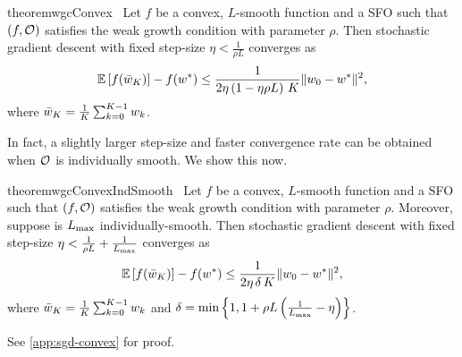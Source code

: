 \begin{restatable}{theorem}{wgcConvex}~\label{thm:wgc-convex}
    Let \( f \) be a convex, \( L \)-smooth function and \oracle{} a \ac{SFO} such that \( \rbr{f, \oracle{}} \) satisfies the weak growth condition with parameter \( \rho \).
    Then stochastic gradient descent with fixed step-size \( \eta < \frac{1}{\rho L} \) converges as
    \[ \E\sbr{\f(\bar \w_K)} - f(\wopt) \leq \frac{1}{2 \eta \rbr{1 - \eta \rho L} \, K} \norm{\w_0 - \wopt}^2, \]
    where \( \bar \w_K = \frac{1}{K} \sum_{k=0}^{K-1} \wk \). 
\end{restatable}

In fact, a slightly larger step-size and faster convergence rate can be obtained when \( \oracle{} \) is individually smooth.
We show this now.

\begin{restatable}{theorem}{wgcConvexIndSmooth}~\label{thm:wgc-convex-ind-smooth}
    Let \( f \) be a convex, \( L \)-smooth function and \oracle{} a \ac{SFO} such that \( \rbr{f, \oracle{}} \) satisfies the weak growth condition with parameter \( \rho \).
    Moreover, suppose \oracle{} is \( \Lmax \) individually-smooth. 
    Then stochastic gradient descent with fixed step-size \( \eta < \frac{1}{\rho L} + \frac{1}{\Lmax} \) converges as
    \[ \E\sbr{f(\bar w_K)} - f(\wopt) \leq \frac{1}{2\eta \, \delta \, K} \norm{\w_0 - \wopt}^2,   \]
    where \( \bar \w_K = \frac{1}{K} \sum_{k=0}^{K-1} \wk \) and \( \delta = \min \cbr{ 1, 1 + \rho L \rbr{\frac{1}{\Lmax} - \eta }} \). 
\end{restatable}
\noindent See \autoref{app:sgd-convex} for proof. \hfill \break


